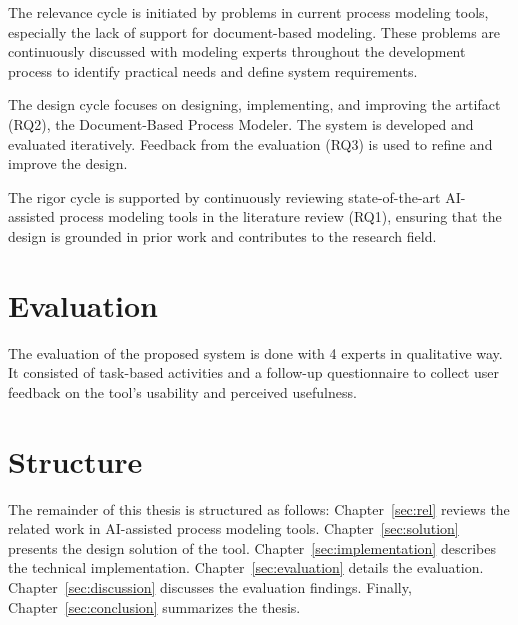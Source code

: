The relevance cycle is initiated by problems in current process modeling tools, especially the lack of support for document-based modeling. These problems are continuously discussed with modeling experts throughout the development process to identify practical needs and define system requirements.

The design cycle focuses on designing, implementing, and improving the artifact (RQ2), the Document-Based Process Modeler. The system is developed and evaluated iteratively. Feedback from the evaluation (RQ3) is used to refine and improve the design.

The rigor cycle is supported by continuously reviewing state-of-the-art AI-assisted process modeling tools in the literature review (RQ1), ensuring that the design is grounded in prior work and contributes to the research field.

\section{Evaluation}
\label{sec:intro:ev}
The evaluation of the proposed system is done with 4 experts in qualitative way. It consisted of task-based activities and a follow-up questionnaire to collect user feedback on the tool's usability and perceived usefulness.

\section{Structure}
\label{sec:intro:struct}
The remainder of this thesis is structured as follows: Chapter~\ref{sec:rel} reviews the related work in AI-assisted process modeling tools. Chapter~\ref{sec:solution} presents the design solution of the tool. Chapter~\ref{sec:implementation} describes the technical implementation. Chapter~\ref{sec:evaluation} details the evaluation. Chapter~\ref{sec:discussion} discusses the evaluation findings. Finally, Chapter~\ref{sec:conclusion} summarizes the thesis.
